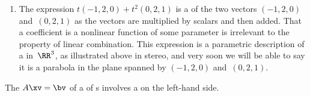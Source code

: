 \begin{example}
\begin{enumerate}
\item 
\begin{figbox}{ {}}%
The expression \(t(-1,2,0)+t^2(0,2,1)\)
is a  of the two vectors \((-1,2,0)\) 
and~\((0,2,1)\) as the vectors are multiplied by scalars and then added.  
That a coefficient is a nonlinear function of some parameter is irrelevant to the property of linear combination.
This expression is a parametric description of a  in~\(\RR^3\), as illustrated above in stereo, and very soon we will be able to say it is a parabola in the plane spanned by \((-1,2,0)\) and~\((0,2,1)\).
\end{figbox}

\end{enumerate}
\end{example}



The  \(A\xv=\bv\) of a  of s involves a  on the left-hand side.

